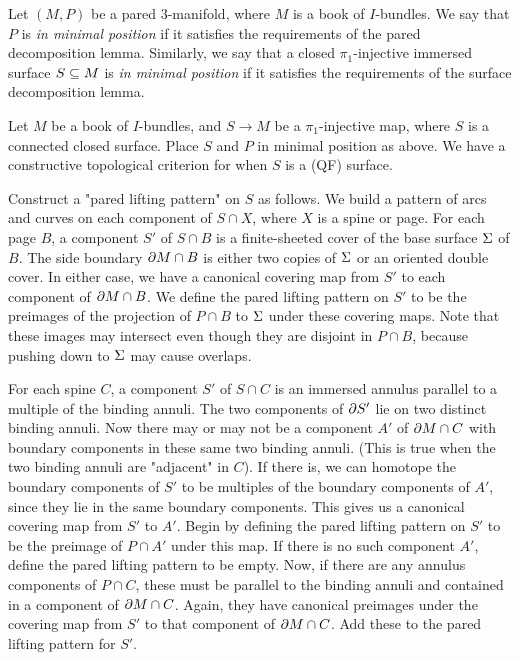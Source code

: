 \begin{defn}

Let $(M,P)$ be a pared $3$-manifold, where $M$ is a book of $I$-bundles.  We
say that $P$ is \emph{in minimal position} if it satisfies the requirements of
the pared decomposition lemma. Similarly, we say that a closed
$\pi_1$-injective immersed surface $S\subseteq M$ is \emph{in minimal position} if
it satisfies the requirements of the surface decomposition lemma.

\end{defn}

Let $M$ be a book of $I$-bundles, and $S \to M$ be a $\pi_1$-injective map,
where $S$ is a connected closed surface.  Place $S$ and $P$ in minimal position
as above.  We have a constructive topological criterion for when $S$ is a (QF)
surface.

Construct a "pared lifting pattern" on $S$ as follows. We build a pattern of
arcs and curves on each component of $S \cap X$, where $X$ is a spine or page.
For each page $B$, a component $S'$ of $S \cap B$ is a finite-sheeted cover of
the base surface $\Sigma$ of $B$. The side boundary $\partial M \cap B$ is either two
copies of $\Sigma$ or an oriented double cover. In either case, we have
a canonical covering map from $S'$ to each component of $\partial M \cap B$. We
define the pared lifting pattern on $S'$ to be the preimages of the projection
of $P \cap B$ to $\Sigma$ under these covering maps.  Note that these images may
intersect even though they are disjoint in $P \cap B$, because pushing down to
$\Sigma$ may cause overlaps.

For each spine $C$, a component $S'$ of $S \cap C$ is an immersed annulus
parallel to a multiple of the binding annuli.  The two components of $\partial S'$
lie on two distinct binding annuli. Now there may or may not be a component
$A'$ of $\partial M \cap C$ with boundary components in these same two binding
annuli.  (This is true when the two binding annuli are "adjacent" in $C$). If
there is, we can homotope the boundary components of $S'$ to be multiples of
the boundary components of $A'$, since they lie in the same boundary
components.  This gives us a canonical covering map from $S'$ to $A'$. Begin by
defining the pared lifting pattern on $S'$ to be the preimage of $P \cap A'$
under this map. If there is no such component $A'$, define the pared lifting
pattern to be empty.  Now, if there are any annulus components of $P \cap C$,
these must be parallel to the binding annuli and contained in a component of
$\partial M \cap C$.  Again, they have canonical preimages under the covering map
from $S'$ to that component of $\partial M \cap C$. Add these to the pared lifting
pattern for $S'$.

